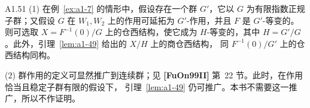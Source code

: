 \begin{remark}{A1.51}\label{rem:a1-51}
\textup{(1)} 在例~\ref{ex:a1-7} 的情形中，假设存在一个群 $G'$，它以
$G$ 为有限指数正规子群；又假设 $G$ 在 $W_1,W_2$ 上的作用可延拓为
$G'$-作用，并且 $F$ 是 $G'$-等变的。则可选取
$X=F^{-1}(0)/G$ 上的仓西结构，使它成为 $H$-等变的，其中
$H=G'/G$。此外，引理~\ref{lem:a1-49} 给出的 $X/H$ 上的商仓西结构，
同 $F^{-1}(0)/G'$ 上的仓西结构同构。

\textup{(2)} 群作用的定义可显然推广到连续群；见
\textbf{[FuOn99II]} 第~22 节。此时，在作用恰当且稳定子群有限的假设下，
引理~\ref{lem:a1-49} 仍可推广。本书不需要这一推广，所以不作证明。
\end{remark}
